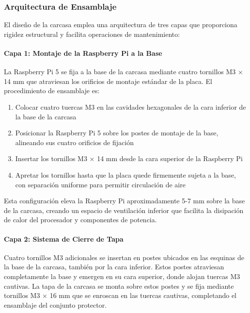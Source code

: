 \subsubsection{Arquitectura de Ensamblaje}

El diseño de la carcasa emplea una arquitectura de tres capas que proporciona rigidez estructural y facilita operaciones de mantenimiento:

\paragraph{Capa 1: Montaje de la Raspberry Pi a la Base}

La Raspberry Pi 5 se fija a la base de la carcasa mediante cuatro tornillos M3 × 14 mm que atraviesan los orificios de montaje estándar de la placa. El procedimiento de ensamblaje es:

\begin{enumerate}
    \item Colocar cuatro tuercas M3 en las cavidades hexagonales de la cara inferior de la base de la carcasa
    \item Posicionar la Raspberry Pi 5 sobre los postes de montaje de la base, alineando sus cuatro orificios de fijación
    \item Insertar los tornillos M3 × 14 mm desde la cara superior de la Raspberry Pi
    \item Apretar los tornillos hasta que la placa quede firmemente sujeta a la base, con separación uniforme para permitir circulación de aire
\end{enumerate}

Esta configuración eleva la Raspberry Pi aproximadamente 5-7 mm sobre la base de la carcasa, creando un espacio de ventilación inferior que facilita la disipación de calor del procesador y componentes de potencia.

\paragraph{Capa 2: Sistema de Cierre de Tapa}

Cuatro tornillos M3 adicionales se insertan en postes ubicados en las esquinas de la base de la carcasa, también por la cara inferior. Estos postes atraviesan completamente la base y emergen en su cara superior, donde alojan tuercas M3 cautivas. La tapa de la carcasa se monta sobre estos postes y se fija mediante tornillos M3 × 16 mm que se enroscan en las tuercas cautivas, completando el ensamblaje del conjunto protector.

